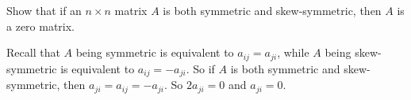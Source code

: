 \documentclass{ximera}
\begin{document}
\begin{exercise}\label{YZ_1.3_skewsym4}
Show that if an $n\times n$ matrix $A$ is both symmetric and skew-symmetric, then $A$ is a zero matrix. 

\begin{solution}
\soln Recall that $A$ being symmetric is equivalent to $a_{ij}=a_{ji}$, while $A$ being skew-symmetric is equivalent to $a_{ij}=-a_{ji}$. So if $A$ is both symmetric and skew-symmetric, then $a_{ji}=a_{ij}=-a_{ji}$. So $2a_{ji}=0$ and $a_{ji}=0$.
\end{solution}
\end{exercise}
\end{document}
